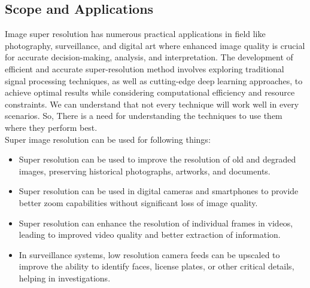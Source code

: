 \subsection{Scope and Applications}
Image super resolution has numerous practical applications in field
like photography, surveillance, and digital art where enhanced image quality is crucial
for accurate decision-making, analysis, and interpretation. The development of efficient
and accurate super-resolution method involves exploring traditional signal processing
techniques, as well as cutting-edge deep learning approaches, to achieve optimal results
while considering computational efficiency and resource constraints. We can understand that not every technique will work well in every scenarios. So, There is a need for understanding the techniques to use them where they perform best.\\
Super image resolution can be used for following things: 
\begin{itemize}
    \item Super resolution can be used to improve the resolution of old and degraded
    images, preserving historical photographs, artworks, and documents. 
    \item Super resolution can be used in digital cameras and smartphones to provide
    better zoom capabilities without significant loss of image quality.
    \item Super resolution can enhance the resolution of individual frames in videos,
    leading to improved video quality and better extraction of information. 
    \item In surveillance systems, low resolution camera feeds can be upscaled to improve
    the ability to identify faces, license plates, or other critical details, helping in
    investigations. 
    
\end{itemize}

